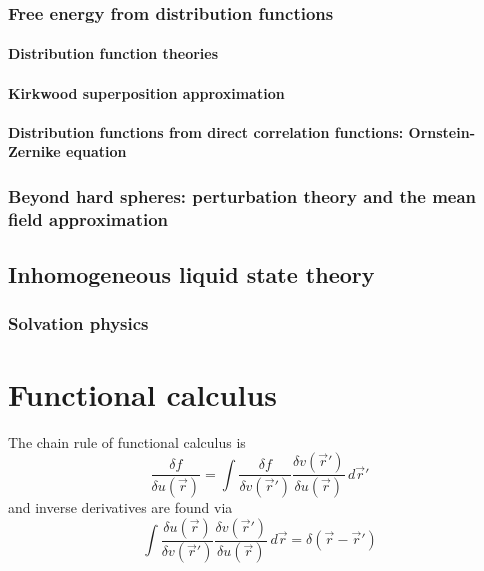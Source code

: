 \subsubsection{Free energy from distribution functions}
\paragraph{Distribution function theories}
\paragraph{Kirkwood superposition approximation}
\paragraph{Distribution functions from direct correlation functions: Ornstein-Zernike equation}

\subsubsection{Beyond hard spheres: perturbation theory and the mean field approximation}

\subsection{Inhomogeneous liquid state theory}

\subsubsection{Solvation physics}

\section{Functional calculus}

The chain rule of functional calculus is
\begin{equation*}
  \frac{\delta f}{\delta u(\vec{r})} =
  \int
  \frac{\delta f}{\delta v(\vec{r}')}
  \frac{\delta v(\vec{r}')}{\delta u(\vec{r})}
  \, d\vec{r}'
\end{equation*}
and inverse derivatives are found via
\begin{equation*}
  \int
  \frac{\delta u(\vec{r})}{\delta v(\vec{r}')}
  \frac{\delta v(\vec{r}')}{\delta u(\vec{r})}
  \, d\vec{r} =
  \delta(\vec{r} - \vec{r}')
\end{equation*}


